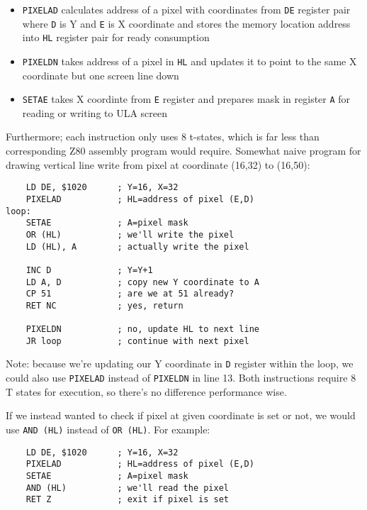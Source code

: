 \documentclass[12pt,twoside,openright,a4paper]{book}
\begin{document}
\begin{itemize}[topsep=1pt,itemsep=1pt]
	\item {\tt PIXELAD} calculates address of a pixel with coordinates from {\tt DE} register pair where {\tt D} is Y and {\tt E} is X coordinate and stores the memory location address into {\tt HL} register pair for ready consumption
	
	\item {\tt PIXELDN} takes address of a pixel in {\tt HL} and updates it to point to the same X coordinate but one screen line down
	
	\item {\tt SETAE} takes X coordinte from {\tt E} register and prepares mask in register {\tt A} for reading or writing to ULA screen
\end{itemize}

Furthermore; each instruction only uses 8 t-states, which is far less than corresponding Z80 assembly program would require. Somewhat naive program for drawing vertical line write from pixel at coordinate (16,32) to (16,50):

\begin{Verbatim}
	LD DE, $1020      ; Y=16, X=32
	PIXELAD           ; HL=address of pixel (E,D)
loop:
	SETAE             ; A=pixel mask
	OR (HL)           ; we'll write the pixel
	LD (HL), A        ; actually write the pixel
	
	INC D             ; Y=Y+1
	LD A, D           ; copy new Y coordinate to A
	CP 51             ; are we at 51 already?
	RET NC            ; yes, return

	PIXELDN           ; no, update HL to next line
	JR loop           ; continue with next pixel
\end{Verbatim}

Note: because we're updating our Y coordinate in {\tt D} register within the loop, we could also use {\tt PIXELAD} instead of {\tt PIXELDN} in line 13. Both instructions require 8 T states for execution, so there's no difference performance wise.

If we instead wanted to check if pixel at given coordinate is set or not, we would use {\tt AND (HL)} instead of {\tt OR (HL)}. For example:

\begin{Verbatim}
	LD DE, $1020      ; Y=16, X=32
	PIXELAD           ; HL=address of pixel (E,D)
	SETAE             ; A=pixel mask
	AND (HL)          ; we'll read the pixel
	RET Z             ; exit if pixel is set
\end{Verbatim}
\end{document}
